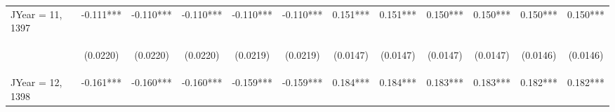 \documentclass[]{article}
\begin{document}
\begin{center}
\begin{tabular}{lccccccccccc}
JYear = 11, 1397 & -0.111*** & -0.110*** & -0.110*** & -0.110*** & -0.110*** & 0.151*** & 0.151*** & 0.150*** & 0.150*** & 0.150*** & 0.150*** \\
\vspace{4pt} & \begin{footnotesize}(0.0220)\end{footnotesize} & \begin{footnotesize}(0.0220)\end{footnotesize} & \begin{footnotesize}(0.0220)\end{footnotesize} & \begin{footnotesize}(0.0219)\end{footnotesize} & \begin{footnotesize}(0.0219)\end{footnotesize} & \begin{footnotesize}(0.0147)\end{footnotesize} & \begin{footnotesize}(0.0147)\end{footnotesize} & \begin{footnotesize}(0.0147)\end{footnotesize} & \begin{footnotesize}(0.0147)\end{footnotesize} & \begin{footnotesize}(0.0146)\end{footnotesize} & \begin{footnotesize}(0.0146)\end{footnotesize} \\
JYear = 12, 1398 & -0.161*** & -0.160*** & -0.160*** & -0.159*** & -0.159*** & 0.184*** & 0.184*** & 0.183*** & 0.183*** & 0.182*** & 0.182*** \\

\end{tabular}
\end{center}
\end{document}
